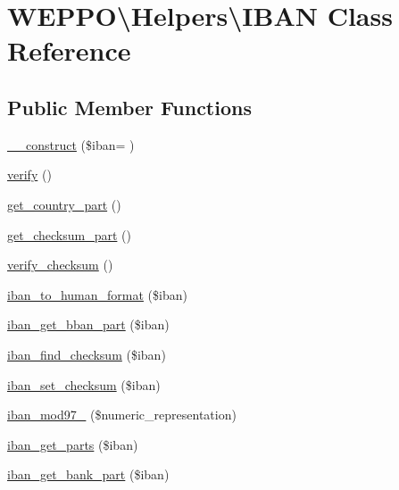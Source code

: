 \hypertarget{classWEPPO_1_1Helpers_1_1IBAN}{}\section{W\+E\+P\+PO\textbackslash{}Helpers\textbackslash{}I\+B\+AN Class Reference}
\label{classWEPPO_1_1Helpers_1_1IBAN}
\subsection*{Public Member Functions}
\begin{DoxyCompactItemize}
\item 
\hyperlink{classWEPPO_1_1Helpers_1_1IBAN_a6f18777dfee998a98638595ae2b7212c}{\+\_\+\+\_\+construct} (\$iban= \textquotesingle{}\textquotesingle{})
\item 
\hyperlink{classWEPPO_1_1Helpers_1_1IBAN_a2ac2d33ca71c0fc9aa25bcdb9fa5219b}{verify} ()
\item 
\hyperlink{classWEPPO_1_1Helpers_1_1IBAN_a658cae9316ba52d1f12ff67611144b76}{get\+\_\+country\+\_\+part} ()
\item 
\hyperlink{classWEPPO_1_1Helpers_1_1IBAN_a49d681c387022bf321b0105b5baa36b2}{get\+\_\+checksum\+\_\+part} ()
\item 
\hyperlink{classWEPPO_1_1Helpers_1_1IBAN_a2587ae19a69f5797ecc43da8c1a0b6d2}{verify\+\_\+checksum} ()
\item 
\hyperlink{classWEPPO_1_1Helpers_1_1IBAN_a44aecdfe60849c5b1771a647bbfbd58b}{iban\+\_\+to\+\_\+human\+\_\+format} (\$iban)
\item 
\hyperlink{classWEPPO_1_1Helpers_1_1IBAN_a343afc22c57d0c54a590ccae710fc1ef}{iban\+\_\+get\+\_\+bban\+\_\+part} (\$iban)
\item 
\hyperlink{classWEPPO_1_1Helpers_1_1IBAN_a91f6eda9b4a3d83793dc2dfc18927086}{iban\+\_\+find\+\_\+checksum} (\$iban)
\item 
\hyperlink{classWEPPO_1_1Helpers_1_1IBAN_a7a2c8ce0e95b4129d6e07baabfff5420}{iban\+\_\+set\+\_\+checksum} (\$iban)
\item 
\hyperlink{classWEPPO_1_1Helpers_1_1IBAN_a1ebc070053da6c7996adf7c9a5e434ef}{iban\+\_\+mod97\+\_} (\$numeric\+\_\+representation)
\item 
\hyperlink{classWEPPO_1_1Helpers_1_1IBAN_a0b8bf633b086b2ebf6e0a43ceadca0b6}{iban\+\_\+get\+\_\+parts} (\$iban)
\item 
\hyperlink{classWEPPO_1_1Helpers_1_1IBAN_ac5bce9848a8a0a9065bc33e774843722}{iban\+\_\+get\+\_\+bank\+\_\+part} (\$iban)

\end{DoxyCompactItemize}
